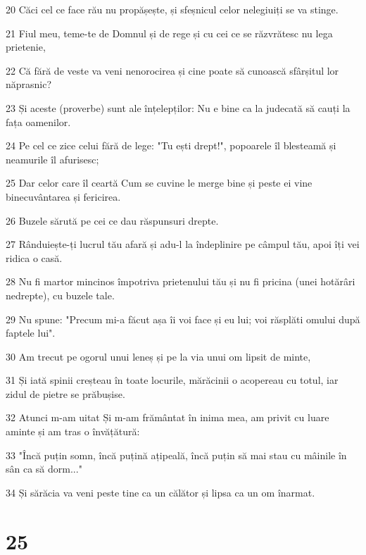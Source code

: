 \par 20 Căci cel ce face rău nu propășește, și sfeșnicul celor nelegiuiți se va stinge.
\par 21 Fiul meu, teme-te de Domnul și de rege și cu cei ce se răzvrătesc nu lega prietenie,
\par 22 Că fără de veste va veni nenorocirea și cine poate să cunoască sfârșitul lor năprasnic?
\par 23 Și aceste (proverbe) sunt ale înțelepților: Nu e bine ca la judecată să cauți la fața oamenilor.
\par 24 Pe cel ce zice celui fără de lege: "Tu ești drept!", popoarele îl blesteamă și neamurile îl afurisesc;
\par 25 Dar celor care îl ceartă Cum se cuvine le merge bine și peste ei vine binecuvântarea și fericirea.
\par 26 Buzele sărută pe cei ce dau răspunsuri drepte.
\par 27 Rânduiește-ți lucrul tău afară și adu-l la îndeplinire pe câmpul tău, apoi îți vei ridica o casă.
\par 28 Nu fi martor mincinos împotriva prietenului tău și nu fi pricina (unei hotărâri nedrepte), cu buzele tale.
\par 29 Nu spune: "Precum mi-a făcut așa îi voi face și eu lui; voi răsplăti omului după faptele lui".
\par 30 Am trecut pe ogorul unui leneș și pe la via unui om lipsit de minte,
\par 31 Și iată spinii creșteau în toate locurile, mărăcinii o acopereau cu totul, iar zidul de pietre se prăbușise.
\par 32 Atunci m-am uitat Și m-am frământat în inima mea, am privit cu luare aminte și am tras o învățătură:
\par 33 "Încă puțin somn, încă puțină ațipeală, încă puțin să mai stau cu mâinile în sân ca să dorm..."
\par 34 Și sărăcia va veni peste tine ca un călător și lipsa ca un om înarmat.

\chapter{25}

